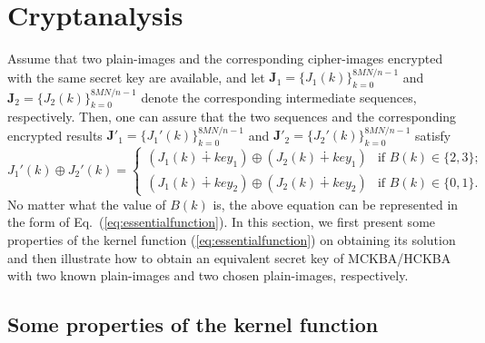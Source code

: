 \documentclass{ws-ijbc}
\begin{document}
\section{Cryptanalysis}
\label{sec:cryptanalysis}

Assume that two plain-images and the corresponding cipher-images encrypted with the same secret key are available, and let  $\bm{J}_1=\{J_1(k)\}_{k=0}^{8MN/n-1}$ and $\bm{J}_2=\{J_2(k)\}_{k=0}^{8MN/n-1}$ denote the corresponding intermediate sequences, respectively. Then, one can assure that the two sequences and the corresponding encrypted results $\bm{J}'_1=\{J_1'(k)\}_{k=0}^{8MN/n-1}$ and $\bm{J}'_2=\{J_2'(k)\}_{k=0}^{8MN/n-1}$
satisfy
\begin{equation}
J_1'(k)\oplus J_2'(k)=
\begin{cases}
(J_1(k)\dotplus key_1)\oplus (J_2(k)\dotplus key_1) & \mbox{if }B(k)\in\{2, 3\};\\
(J_1(k)\dotplus key_2)\oplus (J_2(k)\dotplus key_2) & \mbox{if }B(k)\in\{0, 1\}.
\end{cases}
\label{eq:DifferentialEquation}
\end{equation}
No matter what the value of $B(k)$ is, the above equation can be represented in the form of Eq.~(\ref{eq:essentialfunction}). In this section, we first present some properties of the kernel function (\ref{eq:essentialfunction}) on obtaining its solution and then illustrate how to obtain an equivalent secret key of MCKBA/HCKBA with two known plain-images and two chosen plain-images, respectively.

\subsection{Some properties of the kernel function}
\end{document}
